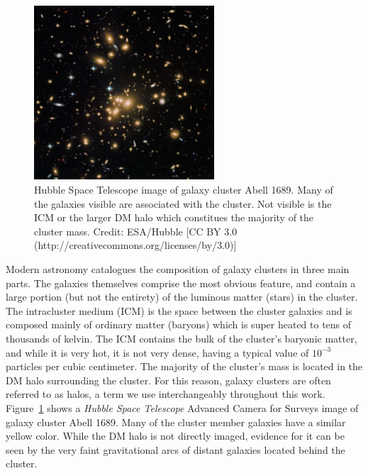 \begin{figure}[ht]
	\begin{center}
		\includegraphics[width=0.6\textwidth]{figures/abell1689_hubble.pdf} 
	\end{center}
	\caption[Hubble Space Telescope image of galaxy cluster Abell 1689.]{Hubble Space Telescope image of galaxy cluster Abell 1689. Many of the galaxies visible are associated with the cluster. Not visible is the ICM or the larger DM halo which constitues the majority of the cluster mass. Credit: ESA/Hubble [CC BY 3.0 (http://creativecommons.org/licenses/by/3.0)]}
	\label{fig: abell1689_hubble} 
\end{figure}

Modern astronomy catalogues the composition of galaxy clusters in three main parts. The galaxies themselves comprise the most obvious feature, and contain a large portion (but not the entirety) of the luminous matter (stars) in the cluster. The intracluster medium (ICM) is the space between the cluster galaxies and is composed mainly of ordinary matter (baryons) which is super heated to tens of thousands of kelvin. The ICM contains the bulk of the cluster's baryonic matter, and while it is very hot, it is not very dense, having a typical value of $10^{-3}$ particles per cubic centimeter. The majority of the cluster's mass is located in the DM halo surrounding the cluster. For this reason, galaxy clusters are often referred to as halos, a term we use interchangeably throughout this work. Figure~\ref{fig: abell1689_hubble} shows a \emph{Hubble Space Telescope} Advanced Camera for Surveys image of galaxy cluster Abell 1689. Many of the cluster member galaxies have a similar yellow color. While the DM halo is not directly imaged, evidence for it can be seen by the very faint gravitational arcs of distant galaxies located behind the cluster.


